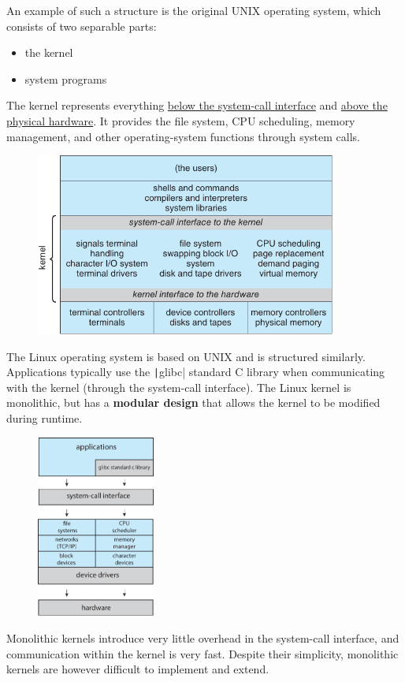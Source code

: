 \documentclass{article}
\begin{document}
An example of such a structure is the original UNIX operating system,
which consists of two separable parts:
\begin{itemize}
    \item the kernel
    \item system programs
\end{itemize}
The kernel represents everything \underline{below the system-call
    interface} and \underline{above the physical hardware}.
It provides the file system, CPU scheduling, memory management, and
other operating-system functions through system calls.
\begin{figure}[H]
    \centering
    \includegraphics[height = 6cm]{figures/UNIX_structure.pdf}
\end{figure}
The Linux operating system is based on UNIX and is structured
similarly.
Applications typically use the \texttt|glibc| standard C
library when communicating with the kernel (through the system-call
interface).
The Linux kernel is monolithic, but has a \textbf{modular design} that
allows the kernel to be modified during runtime.
\begin{figure}[H]
    \centering
    \includegraphics[height = 6cm]{figures/linux_structure.pdf}
\end{figure}
Monolithic kernels introduce very little overhead in the system-call
interface, and communication within the kernel is very fast.
Despite their simplicity, monolithic kernels are however difficult to
implement and extend.
\end{document}
